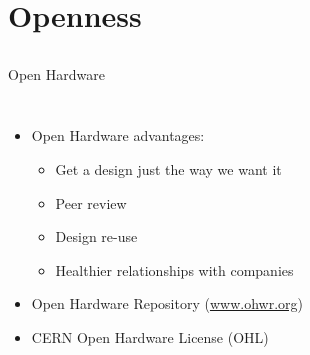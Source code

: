 \documentclass[compress,red]{beamer}
\begin{document}
\section{Openness}
\subsection{}
\begin{frame}{Open Hardware}

  \begin{columns}[c]

      
      \begin{itemize}
        \item Open Hardware advantages:
         \begin{itemize}
            \item Get a design just the way we want it
            \item Peer review
	     \item Design re-use
	     \item Healthier relationships with companies
	\end{itemize}
        \item Open Hardware Repository (\href{http://ohwr.org}{www.ohwr.org})
	\item CERN Open Hardware License (OHL)
      \end{itemize}



\end{columns}
\end{frame}
\end{document}
